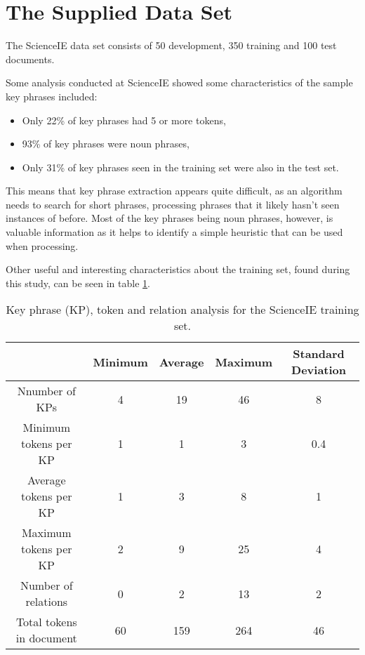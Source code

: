 \section{The Supplied Data Set}
The ScienceIE data set consists of 50 development, 350 training and 100 test documents. 

Some analysis conducted at ScienceIE \cite{Augenstein2017} showed some characteristics of the sample key phrases included:
\begin{itemize}
	\item Only 22\% of key phrases had 5 or more tokens,
	\item 93\% of key phrases were noun phrases,
	\item Only 31\% of key phrases seen in the training set were also in the test set.
\end{itemize}

This means that key phrase extraction appears quite difficult, as an algorithm needs to search for short phrases, processing phrases that it likely hasn't seen instances of before. Most of the key phrases being noun phrases, however, is valuable information as it helps to identify a simple heuristic that can be used when processing.

Other useful and interesting characteristics about the training set, found during this study, can be seen in table \ref{table:traininganalysis}. 

\begin{table}
	\centering
	\begin{tabular}{ c | c c c c }
		& \textbf{Minimum} & \textbf{Average} & \textbf{Maximum} & \textbf{Standard Deviation} \\
		\hline
		Nnumber of KPs & 4 & 19 & 46 & 8 \\
		Minimum tokens per KP & 1 & 1 & 3 & 0.4 \\
		Average tokens per KP & 1 & 3 & 8 & 1 \\
		Maximum tokens per KP & 2 & 9 & 25 & 4 \\
		Number of relations & 0 & 2 & 13 & 2 \\
		Total tokens in document & 60 & 159 & 264 & 46
	\end{tabular}
	\caption[ScienceIE Training Set Analysis]{Key phrase (KP), token and relation analysis for the ScienceIE training set.}
	\label{table:traininganalysis}
\end{table}

